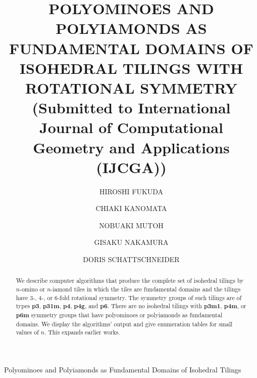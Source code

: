 \documentclass{ws-ijcga}
\begin{document}
{Polyominoes and Polyiamonds as Fundamental Domains of Isohedral Tilings
}

\catchline

\title{
POLYOMINOES AND POLYIAMONDS AS FUNDAMENTAL DOMAINS OF ISOHEDRAL TILINGS
WITH ROTATIONAL SYMMETRY
(Submitted to International Journal of Computational Geometry and Applications (IJCGA))
}


\author{HIROSHI FUKUDA
}

\address{
College of Liberal Arts and Sciences, Kitasato University, 1-15-1 Kitasato, Sagamihara,
Kanagawa 252-0373, JAPAN\\
fukuda@kitasato-u.ac.jp
}

\author{CHIAKI KANOMATA}

\address{
School of Administration and Informatics, University of Shizuoka, 52-1 Yada, Shizuoka 422-8526 JAPAN
}

\author{NOBUAKI MUTOH}

\address{
School of Administration and Informatics, University of Shizuoka, 52-1 Yada, Shizuoka 422-8526 JAPAN\\
muto@u-shizuoka-ken.ac.jp
}

\author{GISAKU NAKAMURA}

\address{
School of Administration and Informatics, University of Shizuoka, 52-1 Yada, Shizuoka 422-8526 JAPAN
}

\author{DORIS SCHATTSCHNEIDER}

\address{
Mathematics Dept. PPHAC Moravian College, 1200 Main St. Bethlehem, PA 18018-6650\\
schattdo@moravian.edu
}

\maketitle


\begin{abstract}
We describe computer algorithms that produce the complete set of isohedral tilings by
$n$-omino or $n$-iamond tiles in which the tiles are fundamental domains and the tilings have 3-, 4-,
or 6-fold rotational symmetry. 
The symmetry groups of such tilings are of types {\bf p3}, {\bf p31m}, {\bf p4},
{\bf p4g}, and {\bf p6}. 
There are no isohedral tilings with {\bf p3m1}, {\bf p4m}, or {\bf p6m} symmetry groups that have
polyominoes or polyiamonds as fundamental domains. 
We display the algorithms' output and give
enumeration tables for small values of $n$. 
This expands earlier works.\cite{fukuda2006,fukuda2008} 
\end{abstract}
\end{document}
